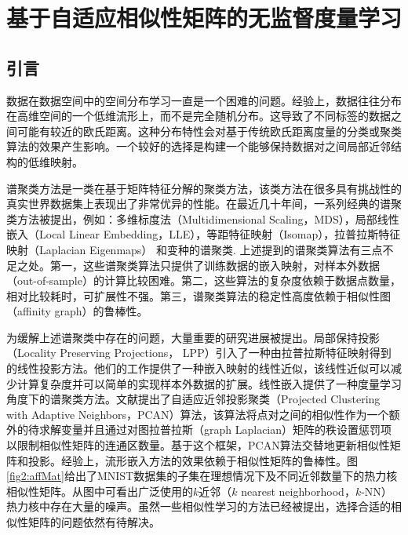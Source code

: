 \chapter{基于自适应相似性矩阵的无监督度量学习}
\section{引言}
数据在数据空间中的空间分布学习一直是一个困难的问题。经验上，数据往往分布在高维空间的一个低维流形上，而不是完全随机分布。这导致了不同标签的数据之间可能有较近的欧氏距离。这种分布特性会对基于传统欧氏距离度量的分类或聚类算法的效果产生影响。一个较好的选择是构建一个能够保持数据对之间局部近邻结构的低维映射。

谱聚类方法是一类在基于矩阵特征分解的聚类方法，该类方法在很多具有挑战性的真实世界数据集上表现出了非常优异的性能。在最近几十年间，一系列经典的谱聚类方法被提出，例如：多维标度法（Multidimensional Scaling，MDS）\cite{cox2000multidimensional}，局部线性嵌入（Local Linear Embedding，LLE）\cite{roweis2000nonlinear}，等距特征映射（Isomap）\cite{tenenbaum2000global}，拉普拉斯特征映射（Laplacian Eigenmaps）  \cite{belkin2001laplacian}和变种的谱聚类\cite{ng2002spectral}. 上述提到的谱聚类算法有三点不足之处。第一，这些谱聚类算法只提供了训练数据的嵌入映射，对样本外数据（out-of-sample）的计算比较困难。第二，这些算法的复杂度依赖于数据点数量，相对比较耗时，可扩展性不强。第三，谱聚类算法的稳定性高度依赖于相似性图（affinity graph）的鲁棒性。

为缓解上述谱聚类中存在的问题，大量重要的研究进展被提出\cite{bengio2004out,niyogi2004locality,fowlkes2004spectral,yan2009fast,chen2011large,pavan2007dominant,premachandran2013consensus,zhu2014constructing,nie2014clustering}。局部保持投影（Locality Preserving Projections， LPP）\cite{niyogi2004locality}引入了一种由拉普拉斯特征映射得到的线性投影方法。他们的工作提供了一种嵌入映射的线性近似，该线性近似可以减少计算复杂度并可以简单的实现样本外数据的扩展。线性嵌入提供了一种度量学习角度下的谱聚类方法。文献\parencite{nie2014clustering}提出了自适应近邻投影聚类（Projected Clustering with Adaptive Neighbors，PCAN）算法，该算法将点对之间的相似性作为一个额外的待求解变量并且通过对图拉普拉斯（graph Laplacian）矩阵的秩设置惩罚项以限制相似性矩阵的连通区数量。基于这个框架，PCAN算法交替地更新相似性矩阵和投影。经验上，流形嵌入方法的效果依赖于相似性矩阵的鲁棒性。图\ref{fig2:affMat}给出了MNIST数据集\cite{lecun1998gradient}的子集在理想情况下及不同近邻数量下的热力核相似性矩阵。从图中可看出广泛使用的$k$近邻（$k$ nearest neighborhood，$k$-NN）热力核中存在大量的噪声。虽然一些相似性学习的方法已经被提出，选择合适的相似性矩阵的问题依然有待解决。

